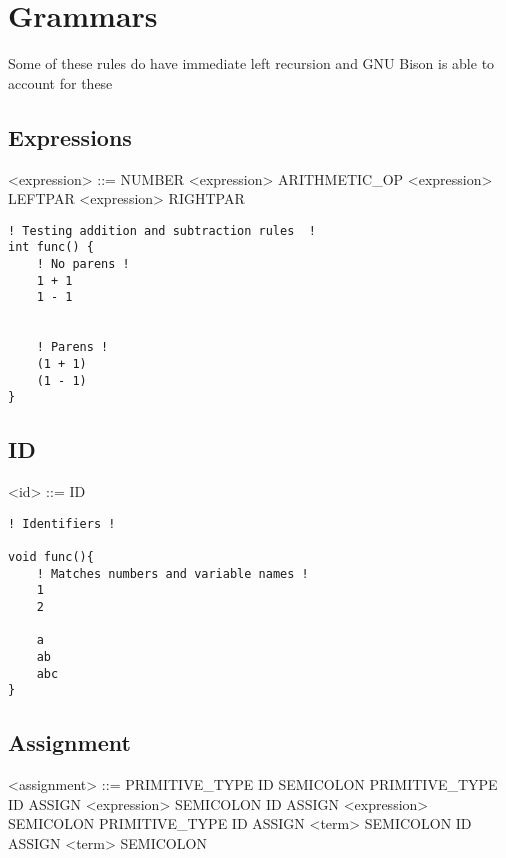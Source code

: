 \documentclass{article}
\begin{document}
\section{Grammars}

Some of these rules do have immediate left recursion and GNU Bison is able to account for these

\subsection{Expressions}

\begin{grammar}

<expression> ::= NUMBER
\alt <expression> ARITHMETIC\_OP <expression> 
\alt LEFTPAR <expression> RIGHTPAR

\end{grammar}

\begin{lstlisting}[style=CStyle]
! Testing addition and subtraction rules  !
int func() {
    ! No parens !
    1 + 1
    1 - 1


    ! Parens !
    (1 + 1)
    (1 - 1)
}
\end{lstlisting}

\newpage

\subsection{ID}

\begin{grammar}
<id> ::= ID
\end{grammar}

\begin{lstlisting}[style=CStyle]
! Identifiers !

void func(){
    ! Matches numbers and variable names !
    1
    2

    a
    ab
    abc
}

\end{lstlisting}

\subsection{Assignment}

\begin{grammar}
<assignment> ::= PRIMITIVE\_TYPE ID SEMICOLON
\alt PRIMITIVE\_TYPE ID ASSIGN <expression> SEMICOLON
\alt ID ASSIGN <expression> SEMICOLON
\alt PRIMITIVE\_TYPE ID ASSIGN <term> SEMICOLON
\alt ID ASSIGN <term> SEMICOLON
\end{grammar}
\end{document}
